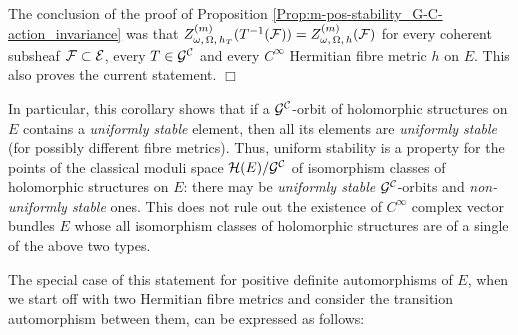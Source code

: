 \documentclass[12pt]{article}
\begin{document}
 The conclusion of the proof of Proposition \ref{Prop:m-pos-stability_G-C-action_invariance} was that $Z_{\omega,\,\Omega,\,h_T}^{(m)}(T^{-1}({\cal F})) = Z_{\omega,\,\Omega,\,h}^{(m)}({\cal F})$ for every coherent subsheaf ${\cal F}\subset{\cal E}$, every $T\in{\cal G}^{\cal C}$ and every $C^\infty$ Hermitian fibre metric $h$ on $E$. This also proves the current statement. \hfill $\Box$


\vspace{2ex}

In particular, this corollary shows that if a ${\cal G}^{\cal C}$-orbit of holomorphic structures on $E$ contains a {\it uniformly stable} element, then all its elements are {\it uniformly stable} (for possibly different fibre metrics). Thus, uniform stability is a property for the points of the classical moduli space ${\cal H}(E)/{\cal G}^{\cal C}$ of isomorphism classes of holomorphic structures on $E$: there may be {\it uniformly stable} ${\cal G}^{\cal C}$-orbits and {\it non-uniformly stable} ones. This does not rule out the existence of $C^\infty$ complex vector bundles $E$ whose all isomorphism classes of holomorphic structures are of a single of the above two types. 

The special case of this statement for positive definite automorphisms of $E$, when we start off with two Hermitian fibre metrics and consider the transition automorphism between them, can be expressed as follows:  
\end{document}

